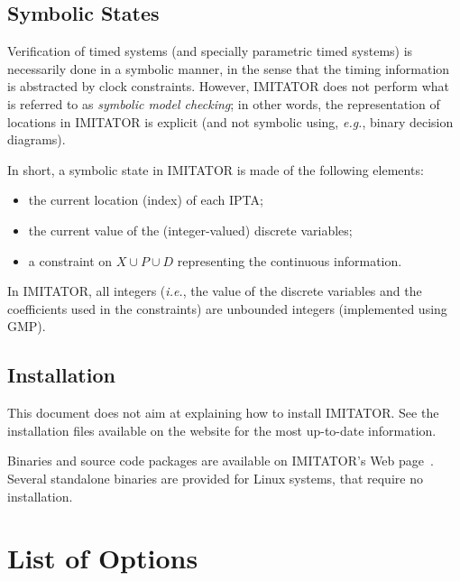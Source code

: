 \documentclass[a4paper,11pt]{report}
\newcommand{\Clock}{X} %
\newcommand{\DVar}{D} %
\newcommand{\Param}{P} %
\newcommand{\imitator}{\textsf{IMITATOR}}
\newcommand{\IPTA}{IPTA}
\newcommand{\eg}{\textcolor{colorok}{\textit{e.g.}, }}
\newcommand{\ie}{\textcolor{colorok}{\textit{i.e.}, }}
\begin{document}
\section{Symbolic States}

Verification of timed systems (and specially parametric timed systems) is necessarily done in a symbolic manner, in the sense that the timing information is abstracted by clock constraints.
However, \imitator{} does not perform what is referred to as \emph{symbolic model checking}; in other words, the representation of locations in \imitator{} is explicit (and not symbolic using, \eg{} binary decision diagrams).

In short, a symbolic state in \imitator{} is made of the following elements:
\begin{itemize}
	\item the current location (index) of each \IPTA{};
	\item the current value of the (integer-valued) discrete variables;
	\item a constraint on $\Clock \cup \Param \cup \DVar$ representing the continuous information.
\end{itemize}
In \imitator{}, all integers (\ie{} the value of the discrete variables and the coefficients used in the constraints) are unbounded integers (implemented using GMP).



\section{Installation}

This document does not aim at explaining how to install \imitator{}.
See the installation files available on the website for the most up-to-date information.

Binaries and source code packages are available on \imitator{}'s Web page~\cite{imitator}.
Several standalone binaries are provided for Linux systems, that require no installation.



\chapter{List of Options}\label{chapter:options}
\end{document}
